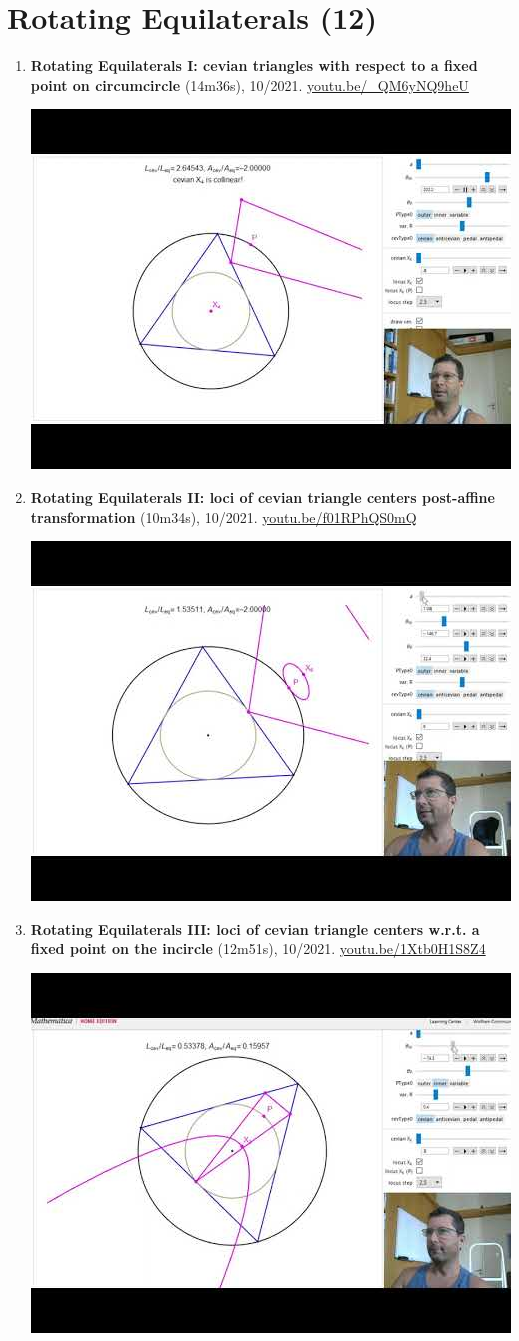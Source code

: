 \documentclass[12pt]{article}
\begin{document}
\section{Rotating Equilaterals (12)}

\begin{enumerate}[resume]
\item \textbf{Rotating Equilaterals I: cevian triangles with respect to a fixed point on circumcircle} (14m36s), 10/2021. \href{https://youtu.be/_QM6yNQ9heU}{\url{youtu.be/\_QM6yNQ9heU}}
\begin{center}\includegraphics[width=.5\textwidth]{pics/_QM6yNQ9heU.jpg}\end{center}
% 
\item \textbf{Rotating Equilaterals II: loci of cevian triangle centers post-affine transformation} (10m34s), 10/2021. \href{https://youtu.be/f01RPhQS0mQ}{\url{youtu.be/f01RPhQS0mQ}}
\begin{center}\includegraphics[width=.5\textwidth]{pics/f01RPhQS0mQ.jpg}\end{center}
% 
\item \textbf{Rotating Equilaterals III: loci of cevian triangle centers w.r.t. a fixed point on the incircle} (12m51s), 10/2021. \href{https://youtu.be/1Xtb0H1S8Z4}{\url{youtu.be/1Xtb0H1S8Z4}}
\begin{center}\includegraphics[width=.5\textwidth]{pics/1Xtb0H1S8Z4.jpg}\end{center}

\end{enumerate}
\end{document}
